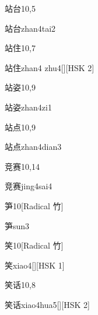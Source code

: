 \begin{entry}{站台}{10,5}
  \begin{phonetics}{站台}{zhan4tai2}
  \end{phonetics}
\end{entry}

\begin{entry}{站住}{10,7}
  \begin{phonetics}{站住}{zhan4 zhu4}[][HSK 2]
  \end{phonetics}
\end{entry}

\begin{entry}{站姿}{10,9}
  \begin{phonetics}{站姿}{zhan4zi1}
  \end{phonetics}
\end{entry}

\begin{entry}{站点}{10,9}
  \begin{phonetics}{站点}{zhan4dian3}
  \end{phonetics}
\end{entry}

\begin{entry}{竞赛}{10,14}
  \begin{phonetics}{竞赛}{jing4sai4}
  \end{phonetics}
\end{entry}

\begin{entry}{笋}{10}[Radical 竹]
  \begin{phonetics}{笋}{sun3}
  \end{phonetics}
\end{entry}

\begin{entry}{笑}{10}[Radical 竹]
  \begin{phonetics}{笑}{xiao4}[][HSK 1]
  \end{phonetics}
\end{entry}

\begin{entry}{笑话}{10,8}
  \begin{phonetics}{笑话}{xiao4hua5}[][HSK 2]
  \end{phonetics}
\end{entry}

